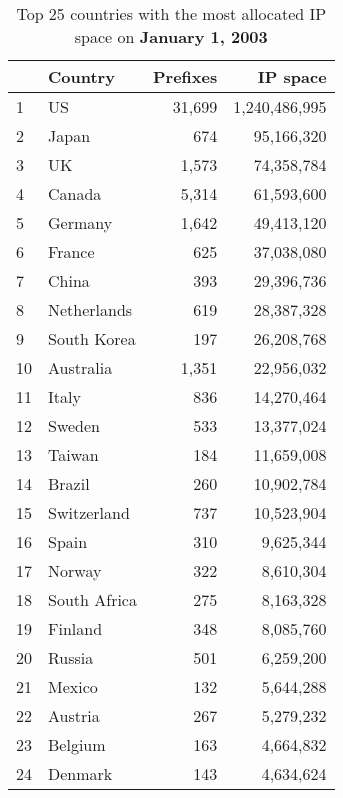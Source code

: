 \begin{table*}[tp]
\begin{minipage}[t]{0.48\textwidth}
	\begin{center}
	\caption{Top 25 countries with the most allocated IP space on \textbf{January 1, 2003}}
	\label{tab:top25 rir ip space 2003}
	\begin{tabular}{|l||l|r|r|}
		\hline
		&      \bf Country		& \bf Prefixes  &  \bf IP space 		\tabularnewline \hline 
1       &       US      		&       31,699  &       1,240,486,995   \tabularnewline
2       &       Japan   		&       674     &       95,166,320      \tabularnewline
3       &       UK      		&       1,573   &       74,358,784      \tabularnewline
4       &       Canada  		&       5,314   &       61,593,600      \tabularnewline
5       &       Germany 		&       1,642   &       49,413,120      \tabularnewline
6       &       France  		&       625     &       37,038,080      \tabularnewline
7       &       China   		&       393     &       29,396,736      \tabularnewline
8       &       Netherlands     &       619     &       28,387,328      \tabularnewline
9       &       South Korea     &       197     &       26,208,768      \tabularnewline
10      &       Australia       &       1,351   &       22,956,032      \tabularnewline
11      &       Italy   		&       836     &       14,270,464      \tabularnewline
12      &       Sweden  		&       533     &       13,377,024      \tabularnewline
13      &       Taiwan  		&       184     &       11,659,008      \tabularnewline
14      &       Brazil  		&       260     &       10,902,784      \tabularnewline
15      &       Switzerland     &       737     &       10,523,904      \tabularnewline
16      &       Spain   		&       310     &       9,625,344       \tabularnewline
17      &       Norway  		&       322     &       8,610,304       \tabularnewline
18      &       South Africa    &       275     &       8,163,328       \tabularnewline
19      &       Finland 		&       348     &       8,085,760       \tabularnewline
20      &       Russia  		&       501     &       6,259,200       \tabularnewline
21      &       Mexico  		&       132     &       5,644,288       \tabularnewline
22      &       Austria 		&       267     &       5,279,232       \tabularnewline
23      &       Belgium 		&       163     &       4,664,832       \tabularnewline
24      &       Denmark 		&       143     &       4,634,624       \tabularnewline

\end{tabular}
\end{center}
\end{minipage}
\end{table*}
